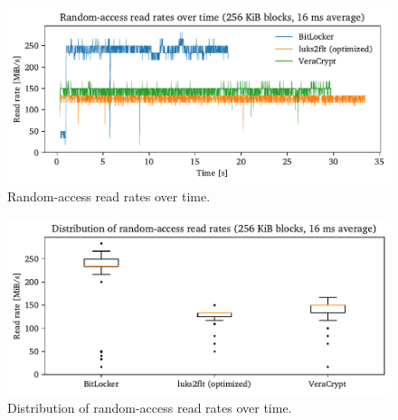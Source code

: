 \begin{figure}[htb!]
	\center
	\includegraphics[scale=1]{../fig/performance.hwexperiments.randovertime.pdf}
	\caption[
		Random-access read rates over time
	]{
		Random-access read rates over time.  
	}
	\label{fig:performance.hwexperiments.randovertime}
\end{figure}

\begin{figure}[htb!]
	\center
	\includegraphics[scale=1]{../fig/performance.hwexperiments.randovertimebox.pdf}
	\caption[
		Distribution of random-access read rates over time
	]{
		Distribution of random-access read rates over time. 
	}
	\label{fig:performance.hwexperiments.randovertimebox}
\end{figure}

